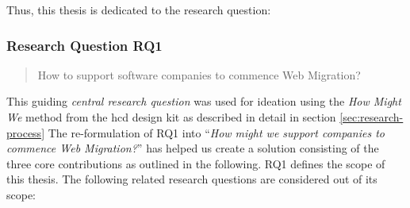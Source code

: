 Thus, this thesis is dedicated to the research question:

\subsubsection*{Research Question RQ1}
\begin{quote}
How to support software companies to commence \gls{Web Migration}?
\end{quote}

This guiding \emph{central research question} \autocite{Creswell2014ResearchDesign} was used for ideation using the \emph{How Might We} method from the \gls{hcd} design kit \autocite{HCD2015} as described in detail in section \cref{sec:research-process}
The re-formulation of RQ1 into ``\emph{How might we support companies to commence \gls{Web Migration}?}'' has helped us create a solution consisting of the three core contributions as outlined in the following.
RQ1 defines the scope of this thesis.
The following related research questions are considered out of its scope:

